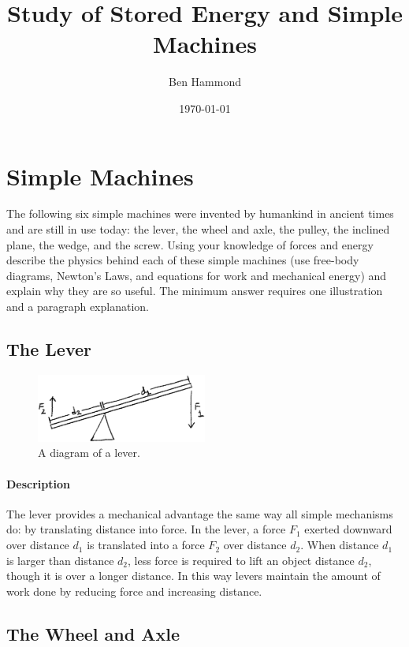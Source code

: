 \documentclass[12pt]{article}
\title{Study of Stored Energy and Simple Machines}
\author{Ben Hammond}
\date{\today}
\begin{document}
	\maketitle
	\newpage

	\section{Simple Machines}
	The following six simple machines were invented by humankind in ancient times and are still in use today: the lever, the wheel and axle, the pulley, the inclined plane, the wedge, and the screw. Using your knowledge of forces and energy describe the physics behind each of these simple machines (use free-body diagrams, Newton’s Laws, and equations for work and mechanical energy) and explain why they are so useful. The minimum answer requires one illustration and a paragraph explanation.

	\subsection{The Lever}
	
	\begin{figure}[H]
		\centerline{\includegraphics[width=0.5\textwidth]{images/lever.EPS}}
		\caption{A diagram of a lever.}
	\end{figure}

	\paragraph{Description}
	The lever provides a mechanical advantage the same way all simple mechanisms do: by translating distance into force. In the lever, a force $F_1$ exerted downward over distance $d_1$ is translated into a force $F_2$ over distance $d_2$. When distance $d_1$ is larger than distance $d_2$, less force is required to lift an object distance $d_2$, though it is over a longer distance. In this way levers maintain the amount of work done by reducing force and increasing distance.
		
	\subsection{The Wheel and Axle}
	
\end{document}
